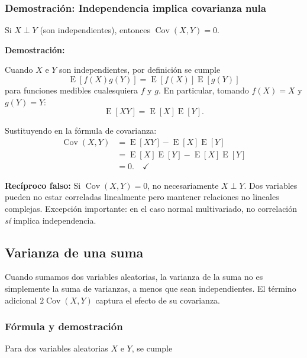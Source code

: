 \documentclass[11pt,a4paper]{article}
\DeclareMathOperator{\E}{E}
\DeclareMathOperator{\Cov}{Cov}
\begin{document}
\subsubsection*{Demostración: Independencia implica covarianza nula}

\begin{proposicion}
Si \(X\perp Y\) (son independientes), entonces \(\Cov(X,Y)=0\).
\end{proposicion}

\noindent\textbf{Demostración:}

Cuando \(X\) e \(Y\) son independientes, por definición se cumple
\[
\E[f(X)g(Y)]=\E[f(X)]\E[g(Y)]
\]
para funciones medibles cualesquiera \(f\) y \(g\). En particular, tomando \(f(X)=X\) y \(g(Y)=Y\):
\[
\E[XY]=\E[X]\E[Y].
\]

Sustituyendo en la fórmula de covarianza:
\begin{align}
\Cov(X,Y) &= \E[XY] - \E[X]\E[Y]\\
&= \E[X]\E[Y] - \E[X]\E[Y]\\
&= 0. \quad\checkmark
\end{align}

\begin{observacion}
\textbf{Recíproco falso:} Si \(\Cov(X,Y)=0\), no necesariamente \(X\perp Y\). Dos variables pueden no estar correladas linealmente pero mantener relaciones no lineales complejas. Excepción importante: en el caso normal multivariado, no correlación \emph{sí} implica independencia.
\end{observacion}

\subsection{Varianza de una suma}

\begin{concepto}
Cuando sumamos dos variables aleatorias, la varianza de la suma no es simplemente la suma de varianzas, a menos que sean independientes. El término adicional \(2\Cov(X,Y)\) captura el efecto de su covarianza.
\end{concepto}

\subsubsection*{Fórmula y demostración}

Para dos variables aleatorias \(X\) e \(Y\), se cumple
\end{document}
